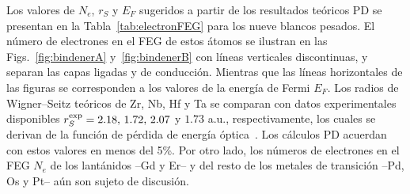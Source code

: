 Los valores de $N_e$, $r_S$ y $E_F$ sugeridos a partir de los resultados 
teóricos PD se presentan en la Tabla~\ref{tab:electronFEG} para los 
nueve blancos pesados. El número de electrones en el FEG de estos átomos 
se ilustran en las Figs.~\ref{fig:bindenerA} y~\ref{fig:bindenerB} con 
líneas verticales discontinuas, y separan las capas ligadas y de 
conducción. 
Mientras que las líneas horizontales de las figuras se corresponden a 
los valores de la energía de Fermi $E_F$.
Los radios de Wigner--Seitz teóricos de Zr, Nb, Hf y Ta se comparan con 
datos experimentales disponibles 
$r_S^{\mbox{\scriptsize exp}}=2.18,\,1.72,\,2.07$ y $1.73$ a.u., 
respectivamente, los cuales se derivan de la función de pérdida de 
energía óptica~\cite{Werner:09,Lynch:75,Isaacson:75,Romaniello:06}.
Los cálculos PD acuerdan con estos valores en menos del 5\%. Por otro 
lado, los números de electrones en el FEG $N_e$ de los lantánidos --Gd y 
Er-- y del resto de los metales de transición --Pd, Os y Pt-- aún son 
sujeto de discusión. 


\begin{comment}
Mis cálculos:
Zr  rs=2.11  EF=0.413
Nb  rs=1.80  EF=0.569
Pd  rs=1.33  EF=1.033
Gd  rs=1.75  EF=0.602
Er  rs=1.52  EF=0.793
Hf  rs=2.08  EF=0.425
Ta  rs=1.80  EF=0.569
Os  rs=1.41  EF=0.921
Pt  rs=1.35  EF=1.015

Data from Strange et al

Gd teo 3.7063 1.8531
Er teo 3.6888 1.8444

Gd exp 3.7605 1.8802
Er exp 3.6713 1.8357

\end{comment}

